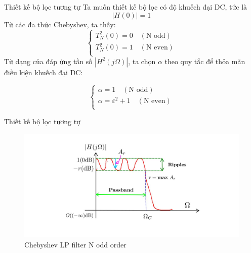 \documentclass[8pt]{beamer}
\begin{document}
\begin{frame}{Thiết kế bộ lọc tương tự}
Ta muốn thiết kế bộ lọc có độ khuếch đại DC, tức là $$|H(0)|=1$$
Từ các đa thức Chebyshev, ta thấy:
\begin{equation*}
\begin{cases}
T^2_{N}(0)=0\quad(\text{N odd})\\
T^2_{N}(0)=1\quad(\text{N even})\\
\end{cases}
\end{equation*}
Từ dạng của đáp ứng tần số $|H^2(j\Omega)|$, ta chọn $\alpha$ theo quy tắc để thỏa mãn điều kiện khuếch đại DC:

\begin{equation*}
\begin{cases}
\alpha=1\quad(\text{N odd})\\
\alpha=\varepsilon^2+1\quad(\text{N even})\\
\end{cases}
\end{equation*}
\end{frame}
\begin{frame}{Thiết kế bộ lọc tương tự}
\begin{figure}[h]
	\includegraphics[width=1\textwidth]{16.jpg}
	\caption{Chebyshev LP filter N odd order}			\label{fig:re2}
		\end{figure}

\end{frame}
\end{document}
